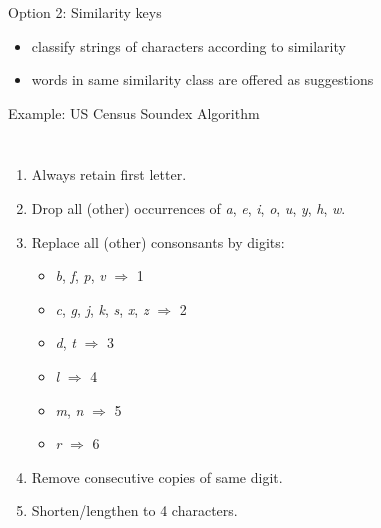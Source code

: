 \documentclass[professionalfonts, xcolor={usenames,svgnames,x11names,table}]{beamer}
\begin{document}
\begin{frame}{Option 2: Similarity keys}
    \begin{itemize}
        \item classify strings of characters according to similarity
        \item words in same similarity class are offered as suggestions
    \end{itemize}
    \begin{exampleblock}{Example: US Census Soundex Algorithm}
        \begin{columns}
            \begin{enumerate}
                \item Always retain first letter.
                \item Drop all (other) occurrences of \emph{a}, \emph{e}, \emph{i}, \emph{o}, \emph{u}, \emph{y}, \emph{h}, \emph{w}.
                \item Replace all (other) consonsants by digits:
                    \begin{itemize}
                        \item \emph{b}, \emph{f}, \emph{p}, \emph{v} $\Rightarrow$ 1
                        \item \emph{c}, \emph{g}, \emph{j}, \emph{k}, \emph{s}, \emph{x}, \emph{z} $\Rightarrow$ 2
                        \item \emph{d}, \emph{t} $\Rightarrow$ 3
                        \item \emph{l} $\Rightarrow$ 4
                        \item \emph{m}, \emph{n} $\Rightarrow$ 5
                        \item \emph{r} $\Rightarrow$ 6
                    \end{itemize}
                \item Remove consecutive copies of same digit.
                \item Shorten\slash lengthen to 4 characters.
            \end{enumerate}


\end{columns}
\end{exampleblock}
\end{frame}
\end{document}
